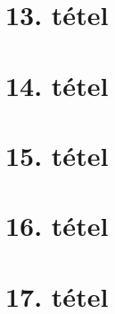 \documentclass[8pt]{extarticle}
\begin{document}
\section{13. tétel}

\newpage
\section{14. tétel}

\newpage
\section{15. tétel}

\newpage
\section{16. tétel}

\newpage
\section{17. tétel}

\end{document}
